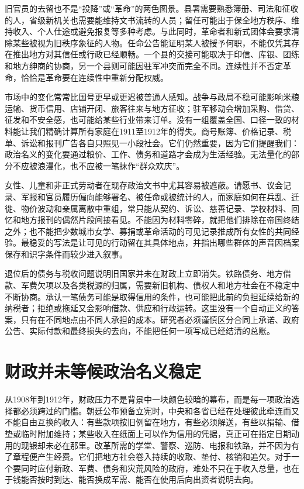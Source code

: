 旧官员的去留也不是“投降”或“革命”的两色图景。县署需要熟悉簿册、司法和征收的人，省级新机关也需要能维持文书流转的人员；留任可能出于保全地方秩序、维持收入、个人仕途或避免报复等多种考虑。与此同时，革命者和新式团体会要求清除某些被视为旧秩序象征的人物。任命公告能证明某人被授予何职，不能仅凭其存在推出地方对其信任或行政已经顺畅。一个县的交接可能取决于印信、库银、团练和地方绅商的协商，另一个县则可能因驻军冲突而完全不同。连续性并不否定革命，恰恰是革命要在连续性中重新分配权威。

市场中的变化常常比国号更早或更迟被普通人感知。战争与政局不稳可能影响米粮运输、货币信用、店铺开闭、旅客往来与地方征收；驻军移动会增加采购、借贷、征发和不安全感，也可能给某些行业带来订单。没有一组覆盖全国、口径一致的材料能让我们精确计算所有家庭在1911至1912年的得失。商号账簿、价格记录、税单、诉讼和报刊广告各自只照见一小段社会。它们仍然重要，因为它们提醒我们：政治名义的变化要通过粮价、工作、债务和道路才会成为生活经验。无法量化的部分不应被浪漫化，也不应被一笔抹作“群众欢庆”。

女性、儿童和非正式劳动者在现存政治文书中尤其容易被遮蔽。请愿书、议会记录、军报和官员履历偏向能够署名、被任命或被统计的人，而家庭如何在兵乱、迁徙、物价波动和亲属离散中重组，常只能从契约、诉讼、慈善记录、学校材料、回忆和地方报刊的偶然片段间接看见。不能因为材料零碎，就把他们排除在帝国终结之外；也不能把少数城市女学、募捐或革命活动的可见记录推成所有女性的共同经验。最稳妥的写法是让可见的行动留在其具体地点，并指出哪些群体的声音因档案保存和识字条件而较少进入叙事。

退位后的债务与税收问题说明旧国家并未在财政上立即消失。铁路债务、地方借款、军费欠项以及各类税源的归属，需要新旧机构、债权人和地方社会在不稳定中不断协商。承认一笔债务可能是取得信用的条件，也可能把此前的负担延续给新的纳税者；拒绝或拖延又会影响借款、供应和行政运转。这里没有一个自动正义的答案，只有在不同地点由不同人承担的成本。研究者必须谨慎区分合同上承诺、政府公告、实际付款和最终损失的去向，不能把任何一项写成已经结清的总账。

\section{财政并未等候政治名义稳定}

从1908年到1912年，财政压力不是背景中一块颜色较暗的幕布，而是每一项政治选择都必须跨过的门槛。朝廷公布预备立宪时，中央和各省已经在处理彼此牵连而又不能自由互换的收入：有些款项按旧例留在地方，有些必须解送，有些以捐输、借垫或临时附加维持；某些收入在纸面上可以作为信用的凭据，真正可在指定日期动用的现银却未必在那里。改革所需的学堂、警察、巡防、电报和铁路，并不因为有了章程便产生经费。它们把地方社会卷入持续的收取、垫付、核销和追欠。对于一个要同时应付新政、军费、债务和灾荒风险的政府，难处不只在于收入总量，也在于钱能否按时到达、能否换成军需、能否在使用后向出资者说明去向。

